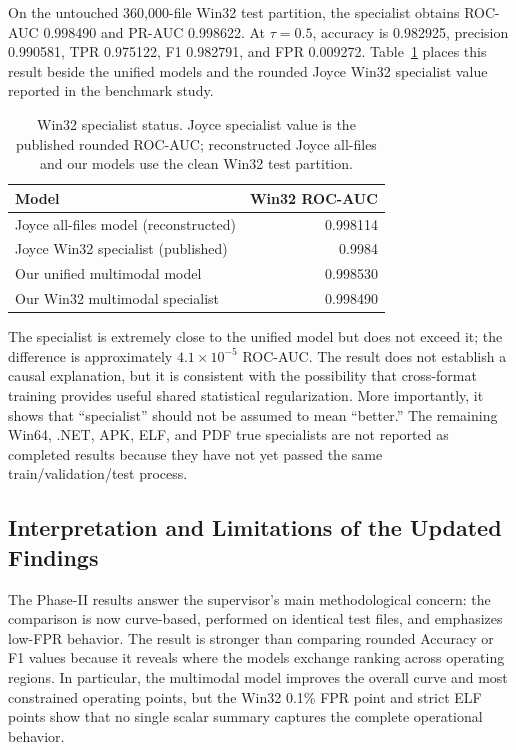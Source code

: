 \documentclass[conference]{IEEEtran}
\begin{document}
On the untouched 360,000-file Win32 test partition, the specialist obtains ROC-AUC 0.998490 and PR-AUC 0.998622. At $\tau=0.5$, accuracy is 0.982925, precision 0.990581, TPR 0.975122, F1 0.982791, and FPR 0.009272. Table~\ref{tab:win32_specialist} places this result beside the unified models and the rounded Joyce Win32 specialist value reported in the benchmark study.

\begin{table}[t]
\centering
\caption{Win32 specialist status. Joyce specialist value is the published rounded ROC-AUC; reconstructed Joyce all-files and our models use the clean Win32 test partition.}
\label{tab:win32_specialist}
\scriptsize
\begin{tabular}{lr}
\toprule
\textbf{Model} & \textbf{Win32 ROC-AUC} \\
\midrule
Joyce all-files model (reconstructed) & 0.998114 \\
Joyce Win32 specialist (published) & 0.9984 \\
Our unified multimodal model & 0.998530 \\
Our Win32 multimodal specialist & 0.998490 \\
\bottomrule
\end{tabular}
\end{table}

The specialist is extremely close to the unified model but does not exceed it; the difference is approximately $4.1\times10^{-5}$ ROC-AUC. The result does not establish a causal explanation, but it is consistent with the possibility that cross-format training provides useful shared statistical regularization. More importantly, it shows that ``specialist'' should not be assumed to mean ``better.'' The remaining Win64, .NET, APK, ELF, and PDF true specialists are not reported as completed results because they have not yet passed the same train/validation/test process.

\subsection{Interpretation and Limitations of the Updated Findings}
The Phase-II results answer the supervisor's main methodological concern: the comparison is now curve-based, performed on identical test files, and emphasizes low-FPR behavior. The result is stronger than comparing rounded Accuracy or F1 values because it reveals where the models exchange ranking across operating regions. In particular, the multimodal model improves the overall curve and most constrained operating points, but the Win32 0.1\% FPR point and strict ELF points show that no single scalar summary captures the complete operational behavior.
\end{document}
